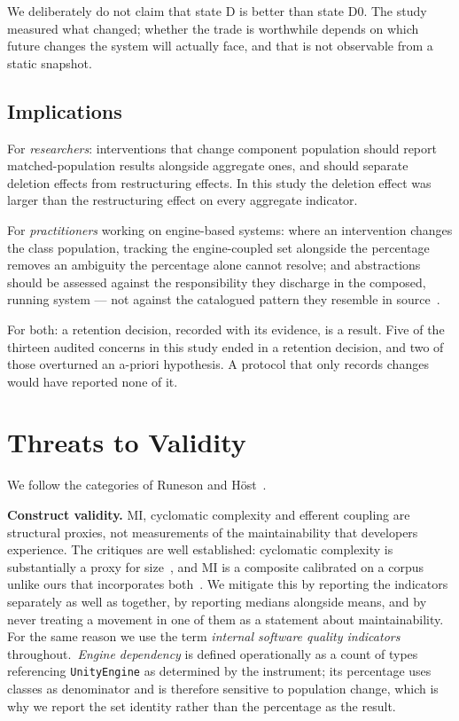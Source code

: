 \documentclass{sbc2019}%
\begin{document}
We deliberately do not claim that state D is better than state D0. The study
measured what changed; whether the trade is worthwhile depends on which future
changes the system will actually face, and that is not observable from a static
snapshot.

\subsection{Implications}

For \emph{researchers}: interventions that change component population should
report matched-population results alongside aggregate ones, and should separate
deletion effects from restructuring effects. In this study the deletion effect
was larger than the restructuring effect on every aggregate indicator.

For \emph{practitioners} working on engine-based systems: where an intervention
changes the class population, tracking the engine-coupled set alongside the
percentage removes an ambiguity the percentage alone cannot resolve; and
abstractions
should be assessed against the responsibility they discharge in the composed,
running system --- not against the catalogued pattern they resemble in source~\cite{gamma1995}.

For both: a retention decision, recorded with its evidence, is a result. Five of the thirteen audited
concerns in this study ended in a retention decision, and two of those
overturned an a-priori hypothesis. A protocol that only records changes would have reported
none of it.


\FloatBarrier

\section{Threats to Validity}\label{sec:threats}

We follow the categories of Runeson and H\"ost~\cite{runeson2009}.

\medskip\noindent\textbf{Construct validity.} MI, cyclomatic complexity and
efferent coupling are structural proxies, not measurements of the maintainability
that developers experience. The critiques are well established: cyclomatic
complexity is substantially a proxy for size~\cite{shepperd1988}, and MI is a
composite calibrated on a corpus unlike ours that incorporates both~\cite{coleman1994,ardito2020}. We mitigate this by reporting the indicators
separately as well as together, by reporting medians alongside means, and by
never treating a movement in one of them as a statement about maintainability.
For the same reason we use the term \emph{internal software quality indicators}
throughout.\ \emph{Engine dependency} is defined operationally as a count of types
referencing \texttt{UnityEngine} as determined by the instrument; its percentage
uses classes as denominator and is therefore sensitive to population change, which
is why we report the set identity rather than the percentage as the result.
\end{document}
